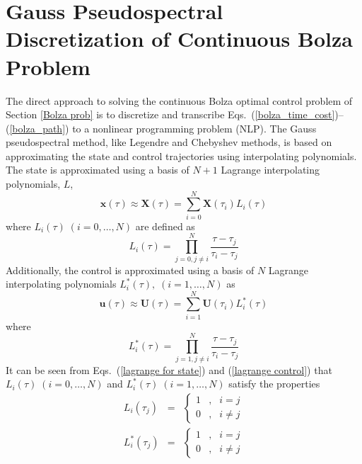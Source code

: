 \documentclass[10pt,final]{report}
\begin{document}
\section{Gauss Pseudospectral Discretization of Continuous Bolza Problem
  \label{section: NLP}}

The direct approach to solving the continuous Bolza optimal control
problem of Section \ref{Bolza prob} is to discretize and transcribe
Eqs.~(\ref{bolza_time_cost})--(\ref{bolza_path}) to a nonlinear
programming problem (NLP).  The Gauss pseudospectral method, like
Legendre and Chebyshev methods, is based on approximating the state
and control trajectories using interpolating polynomials.  The state
is approximated using a basis of $N+1$ Lagrange interpolating
polynomials, $L$,
\begin{equation} \label{state approximation gauss}
  \textbf{x}(\tau) \approx \textbf{X}(\tau) = \sum_{i=0}^N
  \textbf{X}(\tau_i) L_i(\tau)
\end{equation}
where $L_i(\tau)\;(i=0,\ldots,N)$ are defined as
\begin{equation}
  L_i(\tau)  = \displaystyle \prod_{j=0,j\neq i}^{N}
  \frac{\tau-\tau_j}{\tau_i-\tau_j}
  \label{lagrange for state}
\end{equation}
Additionally, the control is approximated using a basis of $N$ Lagrange
interpolating polynomials $L_i^*(\tau),\;(i=1,\ldots,N)$ as
\begin{equation} \label{control approximation}
  \textbf{u}(\tau) \approx \textbf{U}(\tau) =
  \sum_{i=1}^N \textbf{U}(\tau_i) L_i^*(\tau)
\end{equation}
where
\begin{equation}\label{lagrange control}
  L_i^*(\tau) = \displaystyle \prod_{j=1,j\neq
  i}^{N}\frac{\tau-\tau_j}{\tau_i-\tau_j}
\end{equation}
It can be seen from Eqs.~(\ref{lagrange
  for state}) and (\ref{lagrange control}) that
$L_i(\tau)\;(i=0,\ldots,N)$ and $L_i^*(\tau)\;(i=1,\ldots,N)$
satisfy the properties
\begin{eqnarray}
  L_i(\tau_j) & = & \left\{\begin{array}{ccc} 1 & , & i=j \\ 0 & , &
      i\neq j \end{array} \right.
  \label{lagrange state property} \\
  L_i^*(\tau_j) & = & \left\{\begin{array}{ccc} 1 & , & i=j \\ 0 & , &
  i\neq j \end{array} \right.
  \label{lagrange costate property}
\end{eqnarray}
\end{document}
